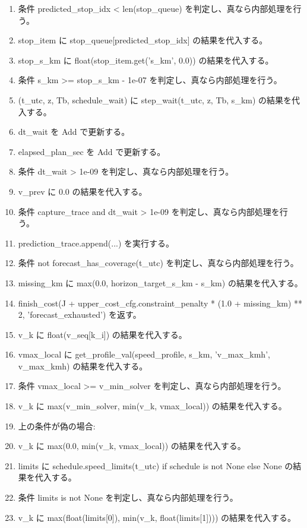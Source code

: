 \documentclass[a4paper,11pt]{article}
\begin{document}
\begin{enumerate}[leftmargin=1.8em]
\item     条件 predicted\_stop\_idx < len(stop\_queue) を判定し、真なら内部処理を行う。
\item       stop\_item に stop\_queue[predicted\_stop\_idx] の結果を代入する。
\item       stop\_s\_km に float(stop\_item.get('s\_km', 0.0)) の結果を代入する。
\item       条件 s\_km >= stop\_s\_km - 1e-07 を判定し、真なら内部処理を行う。
\item     (t\_utc, z, Tb, schedule\_wait) に step\_wait(t\_utc, z, Tb, s\_km) の結果を代入する。
\item     dt\_wait を Add で更新する。
\item     elapsed\_plan\_sec を Add で更新する。
\item     条件 dt\_wait > 1e-09 を判定し、真なら内部処理を行う。
\item       v\_prev に 0.0 の結果を代入する。
\item     条件 capture\_trace and dt\_wait > 1e-09 を判定し、真なら内部処理を行う。
\item       prediction\_trace.append(...) を実行する。
\item     条件 not forecast\_has\_coverage(t\_utc) を判定し、真なら内部処理を行う。
\item       missing\_km に max(0.0, horizon\_target\_s\_km - s\_km) の結果を代入する。
\item       finish\_cost(J + upper\_cost\_cfg.constraint\_penalty * (1.0 + missing\_km) ** 2, 'forecast\_exhausted') を返す。
\item     v\_k に float(v\_seq[k\_i]) の結果を代入する。
\item     vmax\_local に get\_profile\_val(speed\_profile, s\_km, 'v\_max\_kmh', v\_max\_kmh) の結果を代入する。
\item     条件 vmax\_local >= v\_min\_solver を判定し、真なら内部処理を行う。
\item       v\_k に max(v\_min\_solver, min(v\_k, vmax\_local)) の結果を代入する。
\item       上の条件が偽の場合:
\item       v\_k に max(0.0, min(v\_k, vmax\_local)) の結果を代入する。
\item     limits に schedule.speed\_limits(t\_utc) if schedule is not None else None の結果を代入する。
\item     条件 limits is not None を判定し、真なら内部処理を行う。
\item       v\_k に max(float(limits[0]), min(v\_k, float(limits[1]))) の結果を代入する。

\end{enumerate}
\end{document}
